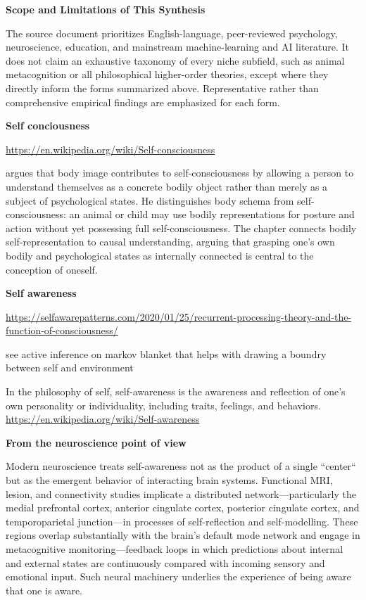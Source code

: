 \documentclass{book}
\providecommand{\ProjectDeepHeading}[2]{%
    \par\medskip\noindent\textbf{#2}\par\smallskip
}
\begin{document}
   \ProjectDeepHeading{5}{Scope and Limitations of This Synthesis}

   The source document prioritizes English-language, peer-reviewed psychology, neuroscience, education, and mainstream machine-learning and AI literature. It does not claim an exhaustive taxonomy of every niche subfield, such as animal metacognition or all philosophical higher-order theories, except where they directly inform the forms summarized above. Representative rather than comprehensive empirical findings are emphasized for each form.

\ProjectDeepHeading{3}{Self conciousness}


\url{https://en.wikipedia.org/wiki/Self-consciousness}



    
    \cite{campbell-1995-the-body-image-and-self-consciousness} argues that body image contributes to self-consciousness by allowing a person to understand themselves as a concrete bodily object rather than merely as a subject of psychological states. He distinguishes body schema from self-consciousness: an animal or child may use bodily representations for posture and action without yet possessing full self-consciousness. The chapter connects bodily self-representation to causal understanding, arguing that grasping one’s own bodily and psychological states as internally connected is central to the conception of oneself.

\ProjectDeepHeading{4}{Self awareness}


\url{https://selfawarepatterns.com/2020/01/25/recurrent-processing-theory-and-the-function-of-consciousness/}
    
    see active inference on markov blanket that helps with drawing a boundry between self and environment
    
    In the philosophy of self, self-awareness is the awareness and reflection of one's own personality or individuality, including traits, feelings, and behaviors. \url{https://en.wikipedia.org/wiki/Self-awareness}
    
    \ProjectDeepHeading{7}{From the neuroscience point of view}
    Modern neuroscience treats self-awareness not as the product of a single ``center`` but as the emergent behavior of interacting brain systems. Functional MRI, lesion, and connectivity studies implicate a distributed network—particularly the medial prefrontal cortex, anterior cingulate cortex, posterior cingulate cortex, and temporoparietal junction—in processes of self-reflection and self-modelling. These regions overlap substantially with the brain's default mode network and engage in metacognitive monitoring—feedback loops in which predictions about internal and external states are continuously compared with incoming sensory and emotional input. Such neural machinery underlies the experience of being aware that one is aware.\cite{fleming-frith-2014-metacognition}
    
\end{document}
